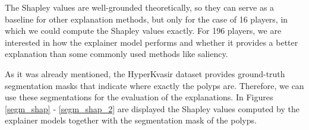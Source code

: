 \documentclass[magisterska,en]{pracamgr}
\begin{document}
The Shapley values are well-grounded theoretically, so they can serve as a baseline for other explanation methods, but only for the case of 16 players, in which we could compute the Shapley values exactly. For 196 players, we are interested in how the explainer model performs and whether it provides a better explanation than some commonly used methods like saliency.





As it was already mentioned, the HyperKvasir dataset provides ground-truth segmentation masks that indicate where exactly the polyps are. Therefore, we can use these segmentations for the evaluation of the explanations.
In Figures \ref{segm_shap} - \ref{segm_shap_2} are displayed the Shapley values computed by the explainer models together with the segmentation mask of the polyps.

\pagebreak
\end{document}
